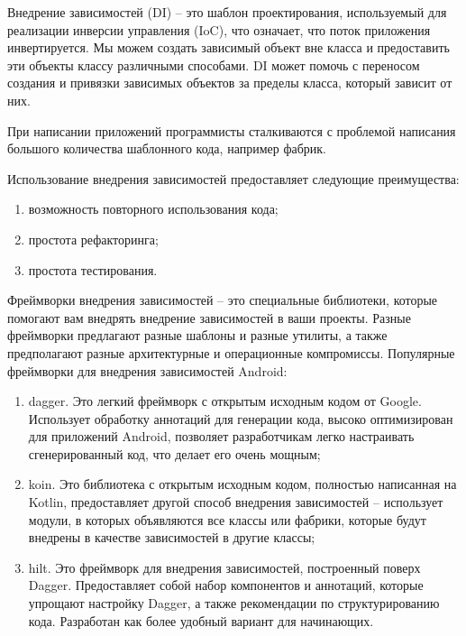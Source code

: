 Внедрение зависимостей (DI) -- это шаблон проектирования, используемый для реализации инверсии управления (IoC), что означает, что поток приложения инвертируется. Мы можем создать зависимый объект вне класса и предоставить эти объекты классу различными способами. DI может помочь с переносом создания и привязки зависимых объектов за пределы класса, который зависит от них.

При написании приложений программисты сталкиваются с проблемой написания большого количества шаблонного кода, например фабрик.

Использование внедрения зависимостей предоставляет следующие преимущества:

\begin{enumerate}
    \item возможность повторного использования кода;
    \item простота рефакторинга;
    \item простота тестирования.
\end{enumerate}

Фреймворки внедрения зависимостей -- это специальные библиотеки, которые помогают вам внедрять внедрение зависимостей в ваши проекты. Разные фреймворки предлагают разные шаблоны и разные утилиты, а также предполагают разные архитектурные и операционные компромиссы. Популярные фреймворки для внедрения зависимостей Android:

\begin{enumerate}
    \item dagger. Это легкий фреймворк с открытым исходным кодом от Google. Использует обработку аннотаций для генерации кода, высоко оптимизирован для приложений Android, позволяет разработчикам легко настраивать сгенерированный код, что делает его очень мощным;
    \item koin. Это библиотека с открытым исходным кодом, полностью написанная на Kotlin, предоставляет другой способ внедрения зависимостей -- использует модули, в которых объявляются все классы или фабрики, которые будут внедрены в качестве зависимостей в другие классы;
    \item hilt. Это фреймворк для внедрения зависимостей, построенный поверх Dagger. Предоставляет собой набор компонентов и аннотаций, которые упрощают настройку Dagger, а также рекомендации по структурированию кода. Разработан как более удобный вариант для начинающих.
\end{enumerate}
